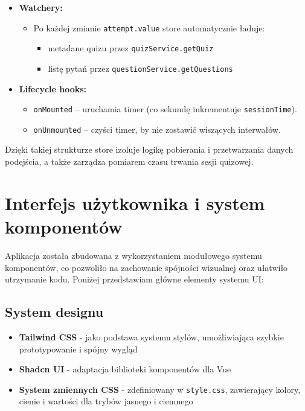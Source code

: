 \documentclass{article}
\begin{document}
\begin{itemize}
        \item \textbf{Watchery:}
          \begin{itemize}
            \item Po każdej zmianie \texttt{attempt.value} store automatycznie ładuje:
              \begin{itemize}
                \item metadane quizu przez \texttt{quizService.getQuiz}
                \item listę pytań przez \texttt{questionService.getQuestions}
              \end{itemize}
          \end{itemize}

        \item \textbf{Lifecycle hooks:}
          \begin{itemize}
            \item \texttt{onMounted} – uruchamia timer (co sekundę inkrementuje \texttt{sessionTime}).
            \item \texttt{onUnmounted} – czyści timer, by nie zostawić wiszących interwałów.
          \end{itemize}
      \end{itemize}

      Dzięki takiej strukturze store izoluje logikę pobierania i przetwarzania danych podejścia, a także zarządza pomiarem czasu trwania sesji quizowej.

      \section{Interfejs użytkownika i system komponentów}
      Aplikacja została zbudowana z wykorzystaniem modułowego systemu komponentów, co pozwoliło na zachowanie spójności wizualnej oraz ułatwiło utrzymanie kodu. Poniżej przedstawiam główne elementy systemu UI:
    
      \subsection{System designu}
        \begin{itemize}
          \item \textbf{Tailwind CSS} - jako podstawa systemu stylów, umożliwiająca szybkie prototypowanie i spójny wygląd
          \item \textbf{Shadcn UI} - adaptacja biblioteki komponentów dla Vue
          \item \textbf{System zmiennych CSS} - zdefiniowany w \texttt{style.css}, zawierający kolory, cienie i wartości dla trybów jasnego i ciemnego
        \end{itemize}
    
\end{document}

